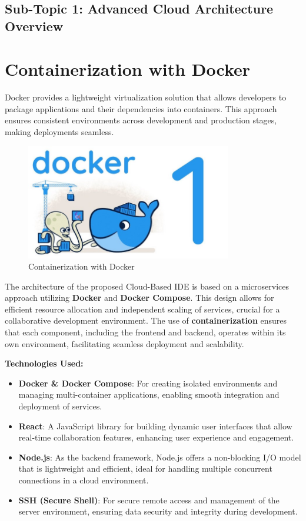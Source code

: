 \documentclass[12pt,a4paper,final]{report}
\begin{document}
\subsection{Sub-Topic 1: Advanced Cloud Architecture Overview}

\section{Containerization with Docker}
\hspace{1cm}
Docker provides a lightweight virtualization solution that allows developers to package applications and their dependencies into containers. This approach ensures consistent environments across development and production stages, making deployments seamless.

\begin{figure}[h] %
    \centering
    \includegraphics[width=0.8\textwidth]{docker.jpg} %
    \caption{Containerization with Docker}
    \label{fig:docker}
\end{figure}


The architecture of the proposed Cloud-Based IDE is based on a microservices approach utilizing \textbf{Docker} and \textbf{Docker Compose}. This design allows for efficient resource allocation and independent scaling of services, crucial for a collaborative development environment. The use of \textbf{containerization} ensures that each component, including the frontend and backend, operates within its own environment, facilitating seamless deployment and scalability.

\textbf{Technologies Used:}
\begin{itemize}
    \item \textbf{Docker \& Docker Compose}: For creating isolated environments and managing multi-container applications, enabling smooth integration and deployment of services.
    \item \textbf{React}: A JavaScript library for building dynamic user interfaces that allow real-time collaboration features, enhancing user experience and engagement.
    \item \textbf{Node.js}: As the backend framework, Node.js offers a non-blocking I/O model that is lightweight and efficient, ideal for handling multiple concurrent connections in a cloud environment.
    \item \textbf{SSH (Secure Shell)}: For secure remote access and management of the server environment, ensuring data security and integrity during development.
\end{itemize}
\end{document}
